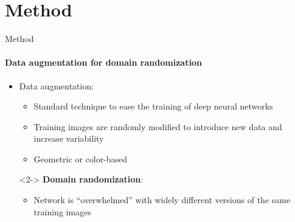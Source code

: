 \documentclass[aspectratio=141]{beamer}
\newcommand{\quotes}[1]{``#1''}
\begin{document}
\section{Method}

\begin{frame}{Method}
    \framesubtitle{Data augmentation for domain randomization}
    \begin{overlayarea}{\textwidth}{12cm}
    \begin{itemize}
        \item<1-> \alert{Data augmentation}:
        \begin{itemize}
            \item Standard technique to ease the training of deep neural networks
            \item Training images are randomly modified to introduce new data and increase variability
            \item Geometric or color-based
        \end{itemize}
        \item[\contour{DEgreen}{$\Rightarrow$}]<2-> \alert{\textbf{Domain randomization}}:
        \begin{itemize}
            \item Network is \quotes{overwhelmed} with widely different versions of the same training images

\end{itemize}
\end{itemize}
\end{overlayarea}
\end{frame}
\end{document}
